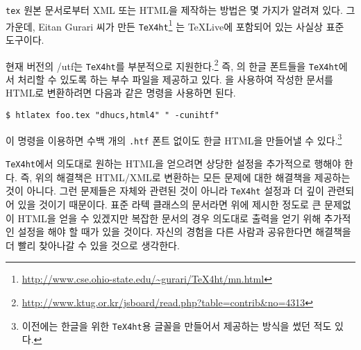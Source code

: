 \texttt{tex} 원본 문서로부터 XML 또는 HTML을 제작하는 방법은 몇 가지가
알려져 있다. 그 가운데, Eitan Gurari 씨가 만든 \texttt{TeX4ht}\footnote{%
  \url{http://www.cse.ohio-state.edu/~gurari/TeX4ht/mn.html}}%
는 \TeX{}Live에 포함되어 있는 사실상 표준 도구이다.

현재 버전의 \kotex/utf는 \texttt{TeX4ht}를 부분적으로 지원한다.\footnote{%
  \url{http://www.ktug.or.kr/jsboard/read.php?table=contrib&no=4313}}
즉, \kotex 의 한글 폰트들을 \texttt{TeX4ht}에서 처리할 수 있도록 하는
부수 파일을 제공하고 있다. \kotex 을 사용하여 작성한 문서를 HTML로 변환하려면
다음과 같은 명령을 사용하면 된다.
\begin{verbatim}
$ htlatex foo.tex "dhucs,html4" " -cunihtf"
\end{verbatim}
이 명령을 이용하면 수백 개의 \texttt{.htf} 폰트 없이도 한글 HTML을
만들어낼 수 있다.\footnote{%
  이전에는 한글을 위한 \texttt{TeX4ht}용 글꼴을 만들어서 제공하는
  방식을 썼던 적도 있다.}

\texttt{TeX4ht}에서 의도대로 원하는 HTML을 얻으려면 상당한 설정을 
추가적으로 행해야 한다. 즉, 위의 해결책은 HTML/XML로 변환하는
모든 문제에 대한 해결책을 제공하는 것이 아니다. 그런 문제들은 \kotex 
자체와 관련된 것이 아니라 \texttt{TeX4ht} 설정과 더 깊이 관련되어
있을 것이기 때문이다.
표준 라텍 클래스의 문서라면 위에 제시한 정도로 큰 문제없이 HTML을
얻을 수 있겠지만 복잡한 문서의 경우 의도대로 출력을 얻기 위해 추가적인
설정을 해야 할 때가 있을 것이다. 자신의 경험을 다른 사람과 공유한다면
해결책을 더 빨리 찾아나갈 수 있을 것으로 생각한다.
